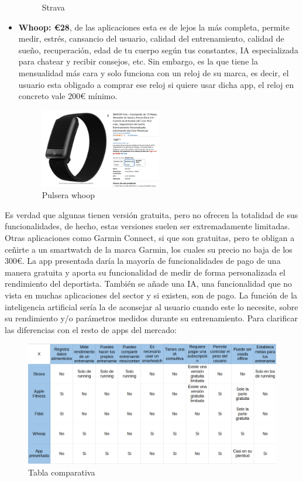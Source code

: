 \begin{itemize}
\begin{figure}[H]
    \caption{Strava}
    \label{fig:Strava}
\end{figure} 
	\item \textbf{Whoop: €28}, de las aplicaciones esta es de lejos la más completa, permite medir, estrés, cansancio del usuario, calidad del entrenamiento, calidad de sueño, recuperación, edad de tu cuerpo según tus constantes, IA especializada para chatear y recibir consejos, etc. Sin embargo, es la que tiene la mensualidad más cara y solo funciona con un reloj de su marca, es decir, el usuario esta obligado a comprar ese reloj si quiere usar dicha app, el reloj en concreto vale 200€ mínimo.
\begin{figure}[H]
   \centering
    \includegraphics[width=0.5\textwidth]{fotos/Pulsera whoop.png}
    \caption{Pulsera whoop}
    \label{fig:Pulsera whoop}
\end{figure} 
\end{itemize}

Es verdad que algunas tienen versión gratuita, pero no ofrecen la totalidad de sus funcionalidades, de hecho, estas versiones suelen ser extremadamente limitadas. Otras aplicaciones como Garmin Connect, si que son gratuitas, pero te obligan a ceñirte a un smartwatch de la marca Garmin, los cuales su precio no baja de los 300€. 
La app presentada daría la mayoría de funcionalidades de pago de una manera gratuita y aporta su funcionalidad de medir de forma personalizada el rendimiento del deportista. También se añade una IA, una funcionalidad que no vista en muchas aplicaciones del sector y si existen, son de pago. La función de la inteligencia artificial sería la de aconsejar al usuario cuando este lo necesite, sobre su rendimiento y/o parámetros medidos durante su entrenamiento.
Para clarificar las diferencias con el resto de apps del mercado:

\begin{landscape}
\begin{figure}[H]
   \centering
    \includegraphics[width=1.65\textwidth]{tablas/tabla.png}
    \caption{Tabla comparativa}
    \label{fig:Tabla comparativa}
\end{figure} 
\end{landscape}

